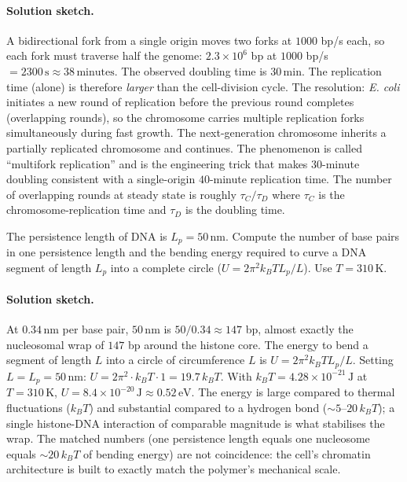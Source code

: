 \paragraph{Solution sketch.} A bidirectional fork from a single origin
moves two forks at $1000$ bp/s each, so each fork must traverse half
the genome: $2.3 \times 10^6$ bp at $1000$ bp/s
$= 2300\,\text{s} \approx 38\,\text{minutes}$. The observed doubling
time is $30\,\text{min}$. The replication time (alone) is therefore
\emph{larger} than the cell-division cycle. The resolution: \emph{E.
coli} initiates a new round of replication before the previous round
completes (overlapping rounds), so the chromosome carries multiple
replication forks simultaneously during fast growth. The next-generation
chromosome inherits a partially replicated chromosome and continues.
The phenomenon is called ``multifork replication'' and is the
engineering trick that makes $30$-minute doubling consistent with a
single-origin $40$-minute replication time. The number of overlapping
rounds at steady state is roughly $\tau_C / \tau_D$ where $\tau_C$ is
the chromosome-replication time and $\tau_D$ is the doubling time.

\begin{exercise}
The persistence length of DNA is $L_p = 50\,\text{nm}$. Compute the
number of base pairs in one persistence length and the bending energy
required to curve a DNA segment of length $L_p$ into a complete
circle ($U = 2\pi^2 k_B T L_p/L$). Use $T = 310\,\si{\kelvin}$.
\end{exercise}

\paragraph{Solution sketch.} At $0.34\,\text{nm}$ per base pair,
$50\,\text{nm}$ is $50/0.34 \approx 147$ bp, almost exactly the
nucleosomal wrap of $147$ bp around the histone core. The energy to
bend a segment of length $L$ into a circle of circumference $L$ is
$U = 2\pi^2 k_B T L_p / L$. Setting $L = L_p = 50\,\text{nm}$:
$U = 2\pi^2 \cdot k_B T \cdot 1 = 19.7\,k_B T$. With
$k_B T = 4.28 \times 10^{-21}\,\text{J}$ at $T = 310\,\text{K}$,
$U = 8.4 \times 10^{-20}\,\text{J} \approx 0.52\,\text{eV}$. The
energy is large compared to thermal fluctuations ($k_B T$) and
substantial compared to a hydrogen bond ($\sim 5$--$20\,k_B T$); a
single histone-DNA interaction of comparable magnitude is what
stabilises the wrap. The matched numbers (one persistence length
equals one nucleosome equals $\sim 20\,k_B T$ of bending energy) are
not coincidence: the cell's chromatin architecture is built to
exactly match the polymer's mechanical scale.

